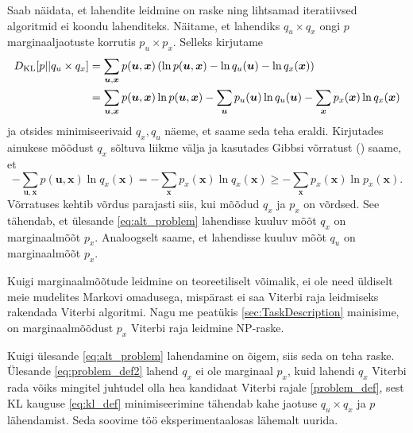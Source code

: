 Saab näidata, et lahendite leidmine on raske ning lihtsamad iteratiivsed algoritmid ei koondu lahenditeks. Näitame, et lahendiks $q_u \times q_x$ ongi $p$ marginaaljaotuste korrutis $p_u \times p_x$. Selleks kirjutame
\begin{align*}
    D_{\mathrm{KL}}[p || q_u \times q_x] &= \sum_{\bm{u}, \bm{x}} p(\bm{u},\bm{x}) \left( \ln p(\bm{u},\bm{x}) - \ln q_u(\bm{u}) - \ln q_x(\bm{x}) \right) \\
    &= \sum_{\bm{u}, \bm{x}} p(\bm{u},\bm{x}) \ln p(\bm{u},\bm{x}) - \sum_{\bm{u}} p_u(\bm{u})  \ln q_u(\bm{u}) -  \sum_{\bm{x}} p_x(\bm{x})\ln q_x(\bm{x})
\end{align*}
ja otsides minimiseerivaid $q_x, q_u$ näeme, et saame seda teha eraldi. Kirjutades ainukese mõõdust $q_x$ sõltuva liikme välja ja kasutades Gibbsi võrratust (\cite{informatsiooniteooria}) saame, et
\[
-\sum_{\bm{u}, \bm{x}} p(\bm{u},\bm{x}) \ln q_x(\bm{x}) = -\sum_{\bm{x}} p_x(\bm{x}) \ln q_x(\bm{x}) \geq -\sum_{\bm{x}} p_x(\bm{x}) \ln p_x(\bm{x}).
\]
Võrratuses kehtib võrdus parajasti siis, kui mõõdud $q_x$ ja $p_x$ on võrdsed. See tähendab, et ülesande \eqref{eq:alt_problem} lahendisse kuuluv mõõt $q_x$ on marginaalmõõt $p_x$. Analoogselt saame, et lahendisse kuuluv mõõt $q_u$ on marginaalmõõt $p_x$.


Kuigi marginaalmõõtude leidmine on teoreetiliselt võimalik, ei ole need üldiselt meie mudelites Markovi omadusega, mispärast ei saa Viterbi raja leidmiseks rakendada Viterbi algoritmi. Nagu me peatükis \ref{sec:TaskDescription} mainisime, on marginaalmõõdust $p_x$ Viterbi raja leidmine NP-raske. 


Kuigi ülesande \eqref{eq:alt_problem} lahendamine on õigem, siis seda on teha raske. Ülesande \eqref{eq:problem_def2} lahend $q_x$ ei ole marginaal $p_x$, kuid lahendi $q_x$ Viterbi rada võiks mingitel juhtudel olla hea kandidaat Viterbi rajale \eqref{problem_def}, sest KL kauguse \eqref{eq:kl_def} minimiseerimine tähendab kahe jaotuse $q_u \times q_x$ ja $p$ lähendamist. Seda soovime töö eksperimentaalosas lähemalt uurida.

